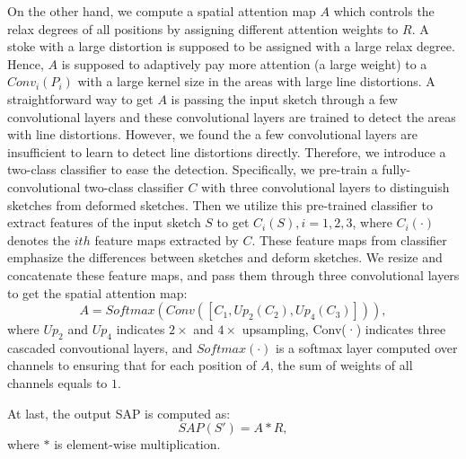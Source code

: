 On the other hand, we compute a spatial attention map $A$ which controls the relax degrees of all positions by assigning different attention weights to $R$.
A stoke with a large distortion is supposed to be assigned with a large relax degree. Hence, $A$ is supposed to adaptively pay more attention (a large weight) to a $Conv_i(P_i)$ with a large kernel size in the areas with large line distortions.
%
A straightforward way to get $A$ is passing the input sketch through a few convolutional layers and these convolutional layers are trained to detect the areas with line distortions. However, we found the a few convolutional layers are insufficient to learn to detect line distortions directly. Therefore, we introduce a two-class classifier to ease the detection. Specifically, we pre-train a fully-convolutional two-class classifier $C$ with three convolutional layers to distinguish sketches from deformed sketches. Then we utilize this pre-trained classifier to extract features of the input sketch $S$ to get ${C_i(S), i=1,2,3}$, where $C_i(·)$ denotes the $ith$ feature maps extracted by $C$. These feature maps from classifier emphasize the differences between sketches and deform sketches. We resize and concatenate these feature maps, and pass them through three convolutional layers to get the spatial attention map:
%	
\begin{equation}
A=Softmax(Conv([C_1, Up_2(C_2), Up_4(C_3)])), 
\end{equation}
%
where $Up_2$ and $Up_4$ indicates $2\times$ and $4\times$ upsampling, Conv(·) indicates three cascaded convoutional layers, and $Softmax(·)$ is a softmax layer computed over channels to ensuring that for each position of $A$, the sum of weights of all channels equals to $1$.

At last, the output SAP is computed as:
%	
\begin{equation}
SAP(S')=A*R,
\end{equation}
%
where $*$ is element-wise multiplication.

%






